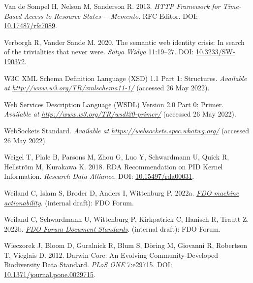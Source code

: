 \begin{CSLReferences}{1}{0}
\leavevmode{}%
Van de Sompel H, Nelson M, Sanderson R. 2013. \emph{HTTP Framework for Time-Based Access to Resource States -\/- Memento}. RFC Editor. DOI: \href{https://doi.org/10.17487/rfc7089}{10.17487/rfc7089}.

\leavevmode{}%
Verborgh R, Vander Sande M. 2020. The semantic web identity crisis: In search of the trivialities that never were. \emph{Satya Widya} 11:19--27. DOI: \href{https://doi.org/10.3233/SW-190372}{10.3233/SW-190372}.

\leavevmode{}%
W3C XML Schema Definition Language (XSD) 1.1 Part 1: Structures. \emph{Available at} \href{http://www.w3.org/TR/xmlschema11-1/}{\emph{http://www.w3.org/TR/xmlschema11-1/}} (accessed 26 May 2022).

\leavevmode{}%
Web Services Description Language (WSDL) Version 2.0 Part 0: Primer. \emph{Available at} \href{http://www.w3.org/TR/wsdl20-primer/}{\emph{http://www.w3.org/TR/wsdl20-primer/}} (accessed 26 May 2022).

\leavevmode{}%
WebSockets Standard. \emph{Available at} \href{https://websockets.spec.whatwg.org/}{\emph{https://websockets.spec.whatwg.org/}} (accessed 26 May 2022).

\leavevmode{}%
Weigel T, Plale B, Parsons M, Zhou G, Luo Y, Schwardmann U, Quick R, Hellström M, Kurakawa K. 2018. RDA Recommendation on PID Kernel Information. \emph{Research Data Alliance}. DOI: \href{https://doi.org/10.15497/rda00031}{10.15497/rda00031}.

\leavevmode{}%
Weiland C, Islam S, Broder D, Anders I, Wittenburg P. 2022a. \emph{\href{https://docs.google.com/document/d/1GHFPAUGpNvYaxctkx-CpvY1vKf_aGZpSlWGOWvyXSiQ/edit}{FDO machine actionability}}. (internal draft): FDO Forum.

\leavevmode{}%
Weiland C, Schwardmann U, Wittenburg P, Kirkpatrick C, Hanisch R, Trautt Z. 2022b. \emph{\href{https://docs.google.com/document/d/1lPNBBROjEoZ6fTfrtdqcMa3Q2G27PoC_/edit}{FDO Forum Document Standards}}. (internal draft): FDO Forum.

\leavevmode{}%
Wieczorek J, Bloom D, Guralnick R, Blum S, Döring M, Giovanni R, Robertson T, Vieglais D. 2012. Darwin Core: An Evolving Community-Developed Biodiversity Data Standard. \emph{PLoS ONE} 7:e29715. DOI: \href{https://doi.org/10.1371/journal.pone.0029715}{10.1371/journal.pone.0029715}.


\end{CSLReferences}
